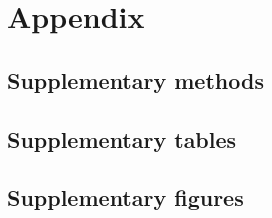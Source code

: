 \documentclass[12pt,a4paper]{article}
\begin{document}



\newpage
\appendix
\section*{Appendix}

\subsection*{Supplementary methods}

\subsection*{Supplementary tables}

\subsection*{Supplementary figures}
\end{document}

